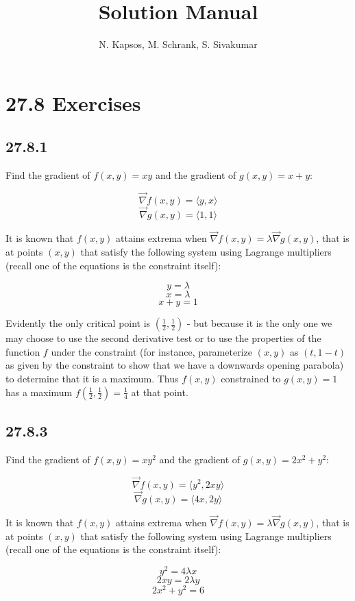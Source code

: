 \documentclass{article}
\title{Solution Manual}
\author{N. Kapsos, M. Schrank, S. Sivakumar}
\date{}
\begin{document}
\maketitle
\setcounter{secnumdepth}{0}

\section{27.8 Exercises}

\subsection{27.8.1}

Find the gradient of $f(x,y) = xy$ and the gradient of $g(x,y) = x+y$:

$$\vec{\nabla}f(x,y) = \langle y,x \rangle$$
$$\vec{\nabla}g(x,y) = \langle 1,1 \rangle$$

It is known that $f(x,y)$ attains extrema when $\vec{\nabla}f(x,y) = \lambda \vec{\nabla}g(x,y)$, that is at points $(x,y)$ that satisfy the following system using Lagrange multipliers (recall one of the equations is the constraint itself):

$$y=\lambda $$
$$x=\lambda $$
$$x+y=1$$

Evidently the only critical point is $(\frac{1}{2},\frac{1}{2})$ - but because it is the only one we may choose to use the second derivative test or to use the properties of the function $f$ under the constraint (for instance, parameterize $(x,y)$ as $(t,1-t)$ as given by the constraint to show that we have a downwards opening parabola) to determine that it is a maximum. Thus $f(x,y)$ constrained to $g(x,y) = 1$ has a maximum $f(\frac{1}{2},\frac{1}{2}) = \frac{1}{4}$ at that point.

\subsection{27.8.3}

Find the gradient of $f(x,y) = xy^2$ and the gradient of $g(x,y) = 2x^2+y^2$:

$$\vec{\nabla}f(x,y) = \langle y^2,2xy \rangle$$
$$\vec{\nabla}g(x,y) = \langle 4x,2y \rangle$$

It is known that $f(x,y)$ attains extrema when $\vec{\nabla}f(x,y) = \lambda \vec{\nabla}g(x,y)$, that is at points $(x,y)$ that satisfy the following system using Lagrange multipliers (recall one of the equations is the constraint itself):

$$y^2 = 4\lambda x$$
$$2xy = 2\lambda y$$
$$2x^2+y^2 = 6$$
\end{document}
